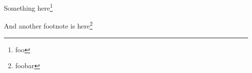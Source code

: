 \documentclass{article}
\begin{document}
Something here\footnote{foo}

\blindtext[2]

And another footnote is here\footnote{foobar}
\end{document}
